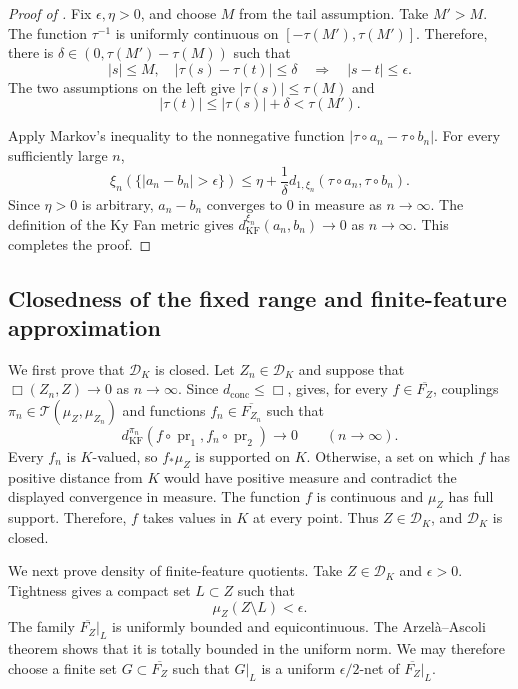\documentclass[11pt]{amsart}
\theoremstyle{plain}
\theoremstyle{definition}
\theoremstyle{remark}
\newcommand{\DK}{\mathcal D_K}
\newcommand{\T}{\mathcal T}
\newcommand{\dconc}{d_{\mathrm{conc}}}
\newcommand{\kf}{d_{\operatorname{KF}}}
\DeclareMathOperator{\pr}{pr}
\begin{document}
\begin{proof}[Proof of ]
Fix $\epsilon,\eta>0$, and choose $M$ from the tail assumption. Take $M'>M$. The function $\tau^{-1}$ is uniformly continuous on $[-\tau(M'),\tau(M')]$. Therefore, there is $\delta\in(0,\tau(M')-\tau(M))$ such that
\[
|s|\leq M,\quad|\tau(s)-\tau(t)|\leq\delta
\quad\Longrightarrow\quad|s-t|\leq\epsilon.
\]
The two assumptions on the left give $|\tau(s)|\leq\tau(M)$ and
\[
|\tau(t)|\leq|\tau(s)|+\delta<\tau(M').
\]

Apply Markov's inequality \cite[proof of Proposition~1.2.6, p.~16]{bakry-gentil-ledoux2014markov} to the nonnegative function $|\tau\circ a_n-\tau\circ b_n|$. For every sufficiently large $n$,
\[
\xi_n(\{|a_n-b_n|>\epsilon\})
\leq\eta+\frac1\delta
d_{1,\xi_n}(\tau\circ a_n,\tau\circ b_n).
\]
Since $\eta>0$ is arbitrary, $a_n-b_n$ converges to $0$ in measure as $n\to\infty$. The definition of the Ky Fan metric gives $\kf^{\xi_n}(a_n,b_n)\to0$ as $n\to\infty$. This completes the proof.
\end{proof}

\subsection{Closedness of the fixed range and finite-feature approximation}
\label{subsec:app-screened-closed-density}

We first prove that $\DK$ is closed. Let $Z_n\in\DK$ and suppose that $\Box(Z_n,Z)\to0$ as $n\to\infty$. Since $\dconc\leq\Box$,  gives, for every $f\in\overline{F_Z}$, couplings $\pi_n\in\T(\mu_Z,\mu_{Z_n})$ and functions $f_n\in\overline{F_{Z_n}}$ such that
\[
\kf^{\pi_n}(f\circ\pr_1,f_n\circ\pr_2)\longrightarrow0
\qquad(n\to\infty).
\]
Every $f_n$ is $K$-valued, so $f_*\mu_Z$ is supported on $K$. Otherwise, a set on which $f$ has positive distance from $K$ would have positive measure and contradict the displayed convergence in measure. The function $f$ is continuous and $\mu_Z$ has full support. Therefore, $f$ takes values in $K$ at every point. Thus $Z\in\DK$, and $\DK$ is closed.

We next prove density of finite-feature quotients. Take $Z\in\DK$ and $\epsilon>0$. Tightness gives a compact set $L\subset Z$ such that
\[
\mu_Z(Z\setminus L)<\epsilon.
\]
The family $\overline{F_Z}|_L$ is uniformly bounded and equicontinuous. The Arzel\`a--Ascoli theorem \cite[7.15, p.~232]{kelley1955general} shows that it is totally bounded in the uniform norm. We may therefore choose a finite set $G\subset\overline{F_Z}$ such that $G|_L$ is a uniform $\epsilon/2$-net of $\overline{F_Z}|_L$.
\end{document}
